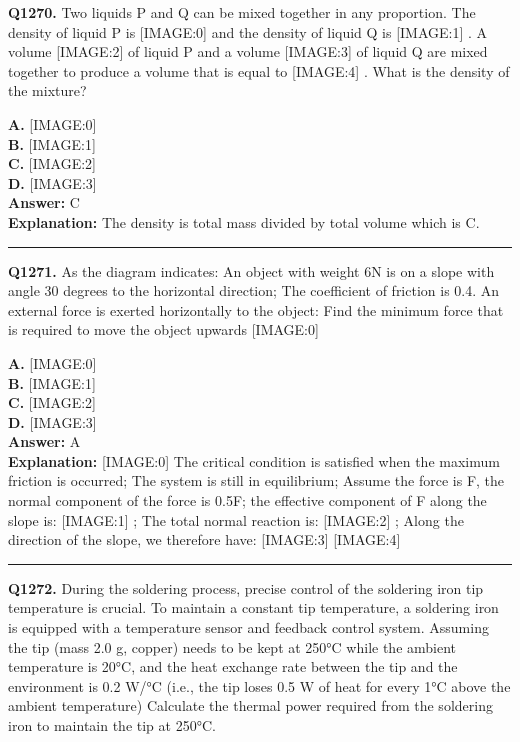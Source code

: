\documentclass[12pt]{article}
\begin{document}
\noindent
\textbf{Q1270.} Two liquids P and Q can be mixed together in any proportion. The density of liquid P is
[IMAGE:0]
and the density of liquid Q is
[IMAGE:1]
. A volume
[IMAGE:2]
of liquid P and a volume
[IMAGE:3]
of liquid Q are mixed together to produce a volume that is equal to
[IMAGE:4]
. What is the density of the mixture?



\textbf{A.} [IMAGE:0] \\
\textbf{B.} [IMAGE:1] \\
\textbf{C.} [IMAGE:2] \\
\textbf{D.} [IMAGE:3] \\

\textbf{Answer:} C \\
\textbf{Explanation:} The density is total mass divided by total volume which is C.

\hrule
\vspace{1em}


\noindent
\textbf{Q1271.} As the diagram indicates: An object with weight 6N is on a slope with angle 30 degrees to the horizontal direction; The coefficient of friction is 0.4. An external force is exerted horizontally to the object: Find the minimum force that is required to move the object upwards
[IMAGE:0]



\textbf{A.} [IMAGE:0] \\
\textbf{B.} [IMAGE:1] \\
\textbf{C.} [IMAGE:2] \\
\textbf{D.} [IMAGE:3] \\

\textbf{Answer:} A \\
\textbf{Explanation:} [IMAGE:0]
The critical condition is satisfied when the maximum friction is occurred; The system is still in equilibrium; Assume the force is F, the normal component of the force is 0.5F; the effective component of F along the slope is:
[IMAGE:1]
; The total normal reaction is:
[IMAGE:2]
; Along the direction of the slope, we therefore have:
[IMAGE:3]
[IMAGE:4]

\hrule
\vspace{1em}


\noindent
\textbf{Q1272.} During the soldering process, precise control of the soldering iron tip temperature is crucial. To maintain a constant tip temperature, a soldering iron is equipped with a temperature sensor and feedback control system. Assuming the tip (mass 2.0 g, copper) needs to be kept at 250°C while the ambient temperature is 20°C, and the heat exchange rate between the tip and the environment is 0.2 W/°C (i.e., the tip loses 0.5 W of heat for every 1°C above the ambient temperature)
Calculate the thermal power required from the soldering iron to maintain the tip at 250°C.
\end{document}
